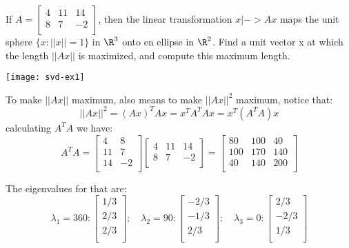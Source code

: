 \begin{eg}
    If \(A = \begin{bmatrix}
        4 & 11 &  14 \\
        8 & 7 &  -2 \\
    \end{bmatrix}\), then the linear transformation \(x |-> Ax\) maps the unit sphere \(\{ x: ||x|| = 1 \} \) in \(\R^3\) onto en ellipse in \(\R^2\). Find a unit vector x at which the length \(||Ax||\) is maximized, and compute this maximum length.   

    \texttt{[image: svd-ex1]}

    To make \(||Ax||\) maximum, also means to make \(||Ax||^2\) maximum, notice that:
    \[
        ||Ax||^2 = (Ax)^TAx = x^TA^TAx = x^T(A^TA)x
    \]
    calculating \(A^TA\) we have:
    \[
        A^TA = \begin{bmatrix}
            4 &  8 \\
            11 &  7 \\
            14 &  -2 \\
        \end{bmatrix}
        \begin{bmatrix}
            4 & 11 &  14 \\
            8 & 7 &  -2 \\
        \end{bmatrix}
        = \begin{bmatrix}
            80 & 100 &  40 \\
            100 & 170 &  140 \\
            40 & 140 &  200 \\
        \end{bmatrix}
    \]

    The eigenvalues for that are:
    \[
        \lambda_1 = 360: \begin{bmatrix}
             1/3 \\
             2/3 \\
             2/3 \\
        \end{bmatrix};
        \quad
        \lambda_2 = 90: \begin{bmatrix}
             -2/3 \\
             -1/3 \\
             2/3 \\
        \end{bmatrix};
        \quad
        \lambda_3 = 0: \begin{bmatrix}
             2/3 \\
             -2/3 \\
             1/3 \\
        \end{bmatrix}
    \]


\end{eg}
